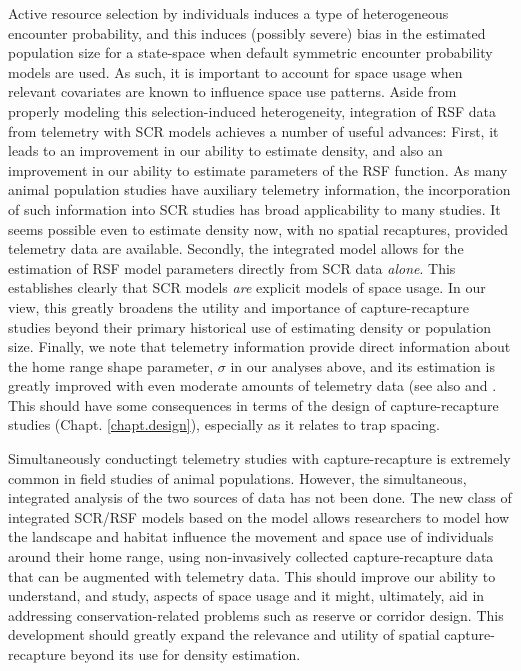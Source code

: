 Active resource selection by individuals induces a type of
heterogeneous encounter probability, and this induces (possibly
severe) bias in the estimated population size for a state-space when
default symmetric encounter probability models are used.  As such, it
is important to account for space usage when relevant covariates are
known to influence space use patterns.  Aside from properly modeling
this selection-induced heterogeneity, integration of RSF data from
telemetry with SCR models achieves a number of useful advances: First,
it leads to an improvement in our ability to estimate density, and
also an improvement in our ability to estimate parameters of the RSF
function.  As many animal population studies have auxiliary telemetry
information, the incorporation of such information into SCR studies
has broad applicability to many studies.  It seems possible even to
estimate density now, with no spatial recaptures, provided telemetry
data are available.  Secondly, the integrated model allows for the
estimation of RSF model parameters directly from SCR data {\it alone}.
This establishes clearly that SCR models {\it are} explicit models of
space usage. In our view, this greatly broadens the utility and
importance of capture-recapture studies beyond their primary
historical use of estimating density or population size. Finally, we
note that telemetry information provide direct information about the
home range shape parameter, $\sigma$ in our analyses above, and its
estimation is greatly improved with even moderate amounts of telemetry
data (see also \citet{sollmann_etal:2012ecol} and
\citet{sollmann_etal:inprepjapplecol}.  This should have some
consequences in terms of the design of capture-recapture studies
(Chapt. \ref{chapt.design}), especially as it relates to trap spacing.

Simultaneously conductingt telemetry studies with capture-recapture is
extremely common in field studies of animal populations. However, the
simultaneous, integrated analysis of the two sources of data has not
been done.  The new class of integrated SCR/RSF models based on the
\citet{royle_etal:2012mee} model allows researchers to model how the
landscape and habitat influence the movement and space use of
individuals around their home range, using non-invasively collected
capture-recapture data that can be augmented with telemetry data.
This should improve our ability to understand, and study, aspects of
space usage and it might, ultimately, aid in addressing
conservation-related problems such as reserve or corridor design. This
development should greatly expand the relevance and utility of spatial
capture-recapture beyond its use for density estimation.






























